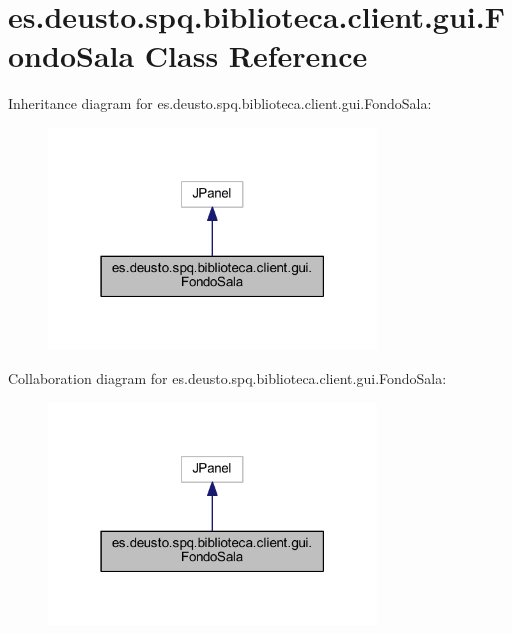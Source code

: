 \hypertarget{classes_1_1deusto_1_1spq_1_1biblioteca_1_1client_1_1gui_1_1_fondo_sala}{}\section{es.\+deusto.\+spq.\+biblioteca.\+client.\+gui.\+Fondo\+Sala Class Reference}
\label{classes_1_1deusto_1_1spq_1_1biblioteca_1_1client_1_1gui_1_1_fondo_sala}


Inheritance diagram for es.\+deusto.\+spq.\+biblioteca.\+client.\+gui.\+Fondo\+Sala\+:
\nopagebreak
\begin{figure}[H]
\begin{center}
\leavevmode
\includegraphics[width=247pt]{classes_1_1deusto_1_1spq_1_1biblioteca_1_1client_1_1gui_1_1_fondo_sala__inherit__graph}
\end{center}
\end{figure}


Collaboration diagram for es.\+deusto.\+spq.\+biblioteca.\+client.\+gui.\+Fondo\+Sala\+:
\nopagebreak
\begin{figure}[H]
\begin{center}
\leavevmode
\includegraphics[width=247pt]{classes_1_1deusto_1_1spq_1_1biblioteca_1_1client_1_1gui_1_1_fondo_sala__coll__graph}
\end{center}
\end{figure}

